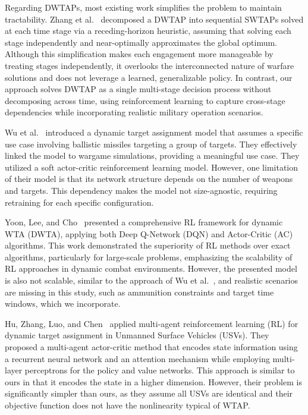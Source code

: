 \documentclass{ieeeaccess}
\begin{document}
Regarding DWTAPs, most existing work simplifies the problem to maintain tractability. Zhang et al.~\cite{zhang2020efficient,zhang2020dynamic} decomposed a DWTAP into sequential SWTAPs solved at each time stage via a receding-horizon heuristic, assuming that solving each stage independently and near-optimally approximates the global optimum. Although this simplification makes each engagement more manageable by treating stages independently, it overlooks the interconnected nature of warfare solutions and does not leverage a learned, generalizable policy. In contrast, our approach solves DWTAP as a single multi-stage decision process without decomposing across time, using reinforcement learning to capture cross-stage dependencies while incorporating realistic military operation scenarios.

Wu et al.~\cite{wu2022dynamic} introduced a dynamic target assignment model that assumes a specific use case involving ballistic missiles targeting a group of targets. They effectively linked the model to wargame simulations, providing a meaningful use case. They utilized a soft actor-critic reinforcement learning model. However, one limitation of their model is that its network structure depends on the number of weapons and targets. This dependency makes the model not size-agnostic, requiring retraining for each specific configuration.

Yoon, Lee, and Cho~\cite{yoon2024reinforcement} presented a comprehensive RL framework for dynamic WTA (DWTA), applying both Deep Q-Network (DQN) and Actor-Critic (AC) algorithms. This work demonstrated the superiority of RL methods over exact algorithms, particularly for large-scale problems, emphasizing the scalability of RL approaches in dynamic combat environments. However, the presented model is also not scalable, similar to the approach of Wu et al.~\cite{wu2022dynamic}, and realistic scenarios are missing in this study, such as ammunition constraints and target time windows, which we incorporate.

Hu, Zhang, Luo, and Chen~\cite{hu2024} applied multi-agent reinforcement learning (RL) for dynamic target assignment in Unmanned Surface Vehicles (USVs). They proposed a multi-agent actor-critic method that encodes state information using a recurrent neural network and an attention mechanism while employing multi-layer perceptrons for the policy and value networks. This approach is similar to ours in that it encodes the state in a higher dimension. However, their problem is significantly simpler than ours, as they assume all USVs are identical and their objective function does not have the nonlinearity typical of WTAP.
\end{document}
